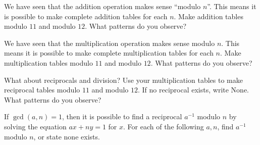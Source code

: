 \documentclass[12pt]{exam}
\begin{document}
\begin{questions}
  \question We have seen that the addition operation makes sense ``modulo $n$''. This means it is possible to make complete addition tables for each $n$. Make addition tables modulo $11$ and modulo $12$. What patterns do you observe?
  \begin{center}

  \end{center}
  \newpage
  \question We have seen that the multiplication operation makes sense modulo $n$. This means it is possible to make complete multiplication tables for each $n$. Make multiplication tables modulo $11$ and modulo $12$. What patterns do you observe?
  \begin{center}

  \end{center}
  \newpage
  \question What about reciprocals and division? Use your multiplication tables to make reciprocal tables modulo $11$ and modulo $12$. If no reciprocal exists, write None. What patterns do you observe?
  \begin{center}
    \quad\quad
  \end{center}
  \newpage
  \question If $\gcd(a,n)=1$, then it is possible to find a reciprocal $a^{-1}$ modulo $n$ by solving the equation $ax+ny=1$ for $x$. For each of the following $a,n$, find $a^{-1}$ modulo $n$, or state none exists.
  \begin{parts}

\end{parts}
\end{questions}
\end{document}
